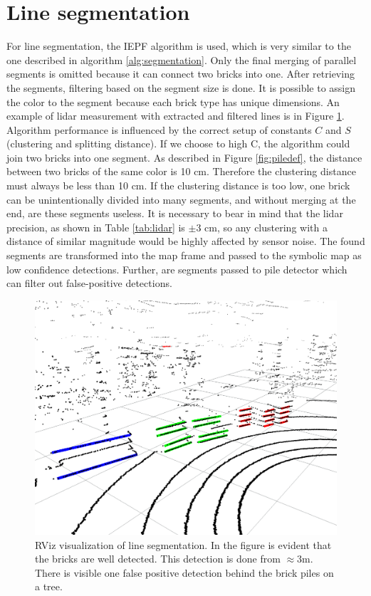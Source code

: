 \section{Line segmentation}
For line segmentation, the IEPF algorithm is used, which is very similar to the one described in algorithm \ref{alg:segmentation}. Only the final merging of parallel segments is omitted because it can connect two bricks into one. After retrieving the segments, filtering based on the segment size is done. It is possible to assign the color to the segment because each brick type has unique dimensions. An example of lidar measurement with extracted and filtered lines is in Figure \ref{fig:segments}. Algorithm performance is influenced by the correct setup of constants $C$ and $S$ (clustering and splitting distance). If we choose to high C, the algorithm could join two bricks into one segment. As described in Figure \ref{fig:piledef}, the distance between two bricks of the same color is 10 cm. Therefore the clustering distance must always be less than 10 cm. If the clustering distance is too low, one brick can be unintentionally divided into many segments, and without merging at the end, are these segments useless. It is necessary to bear in mind that the lidar precision, as shown in Table \ref{tab:lidar} is $\pm3$ cm, so any clustering with a distance of similar magnitude would be highly affected by sensor noise. The found segments are transformed into the map frame and passed to the symbolic map as low confidence detections. Further, are segments passed to pile detector which can filter out false-positive detections.

\hspace{8mm}

\begin{figure}[H]
\centering
\includegraphics[scale=0.43]{fig/segments}
\caption[Line segmentation visualization]{RViz visualization of line segmentation. In the figure is evident that the bricks are well detected. This detection is done from $\approx3$m. There is visible one false positive detection behind the brick piles on a tree.}
\label{fig:segments}
\end{figure}



